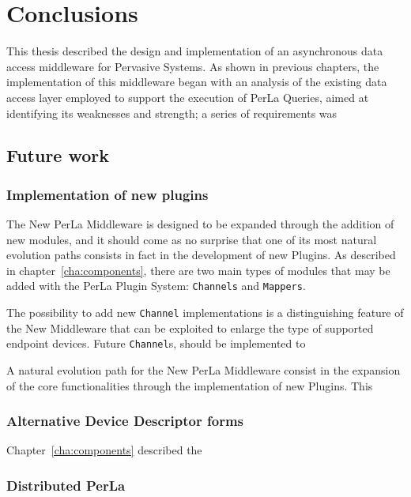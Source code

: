 \chapter{Conclusions}
\label{cha:conclusions}

This thesis described the design and implementation of an asynchronous data
access middleware for Pervasive Systems. As shown in previous chapters, the
implementation of this middleware began with an analysis of the existing data
access layer employed to support the execution of PerLa Queries, aimed at
identifying its weaknesses and strength; a series of requirements was 


\section{Future work}

\subsection{Implementation of new plugins}

The New PerLa Middleware is designed to be expanded through the addition of new
modules, and it should come as no surprise that one of its most natural
evolution paths consists in fact in the development of new Plugins. As
described in chapter~\ref{cha:components}, there are two main types of modules
that may be added with the PerLa Plugin System: \texttt{Channels} and
\texttt{Mappers}.

The possibility to add new \texttt{Channel} implementations is a distinguishing
feature of the New Middleware that can be exploited to enlarge the type of
supported endpoint devices. Future \texttt{Channel}s, should be implemented to


A natural evolution path for the New PerLa Middleware consist in the expansion
of the core functionalities through the implementation of new Plugins. This

\subsection{Alternative Device Descriptor forms}

Chapter~\ref{cha:components} described the 

\subsection{Distributed PerLa}
